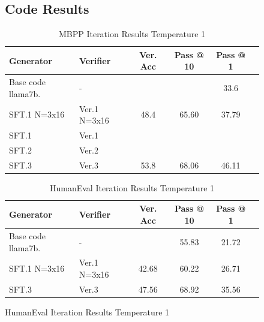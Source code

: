 \begin{figure}[ht]
\subsection{Code Results}
\begin{table}[t]
\caption{MBPP Iteration Results Temperature 1}
\label{sample-table}
\vskip 0.15in
\begin{center}
\begin{small}
\begin{sc}
\begin{tabular}{llcccr}
\toprule
Generator & Verifier & Ver. Acc & Pass @ 10 & Pass @ 1 \\
\midrule
Base code llama7b. & - &  &  & 33.6 \\
\midrule
SFT.1 N=3x16 & Ver.1 N=3x16 & 48.4 & 65.60 & 37.79\\
\midrule
SFT.1 & Ver.1 &  &  &  \\
SFT.2 & Ver.2 &  &  &  \\
SFT.3 & Ver.3  & 53.8 & 68.06 & 46.11  \\ 

\bottomrule
\end{tabular}
\end{sc}
\end{small}
\end{center}
\vskip -0.1in
\end{table}

\begin{table}[t]
\caption{HumanEval Iteration Results Temperature 1}
\label{sample-table}
\vskip 0.15in
\begin{center}
\begin{small}
\begin{sc}
\begin{tabular}{llcccr}
\toprule
Generator & Verifier & Ver. Acc & Pass @ 10 & Pass @ 1 \\
\midrule
Base code llama7b. & - &  &  55.83 & 21.72\\
\midrule
SFT.1 N=3x16 & Ver.1 N=3x16 & 42.68 & 60.22 & 26.71 \\
SFT.3 & Ver.3  & 47.56 & 68.92 & 35.56  \\ 

\bottomrule
\end{tabular}
\end{sc}
\end{small}
\end{center}
\vskip -0.1in
\end{table}




\end{figure}

